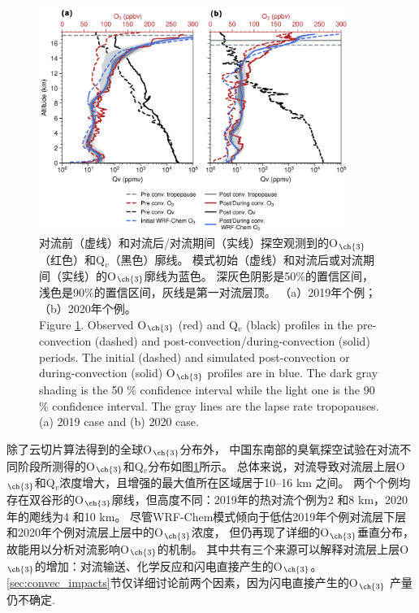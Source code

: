 \begin{figure}[H]
\centering
\includegraphics[width=0.9\textwidth]{./figures/ozonesonde_profile.png}
\caption{对流前（虚线）和对流后/对流期间（实线）探空观测到的O$_{\ch{3}}$（红色）和Q$_v$（黑色）廓线。
模式初始（虚线）和对流后或对流期间（实线）的O$_{\ch{3}}$廓线为蓝色。
深灰色阴影是50\%的置信区间，浅色是90\%的置信区间，灰线是第一对流层顶。
（a）2019年个例；（b）2020年个例。\\
Figure \ref{fig:ozonesonde_profile}. Observed O$_{\ch{3}}$ (red) and Q$_v$ (black) profiles in the pre-convection (dashed) and post-convection/during-convection (solid) periods.
The initial (dashed) and simulated post-convection or during-convection (solid) O$_{\ch{3}}$ profiles are in blue.
The dark gray shading is the 50 \% confidence interval while the light one is the 90 \% confidence interval.
The gray lines are the lapse rate tropopauses.
(a) 2019 case and (b) 2020 case.
}
\label{fig:ozonesonde_profile}
\end{figure}

除了云切片算法得到的全球O$_{\ch{3}}$分布外，
中国东南部的臭氧探空试验在对流不同阶段所测得的O$_{\ch{3}}$和Q$_v$分布如图\ref{fig:ozonesonde_profile}所示。
总体来说，对流导致对流层上层O$_{\ch{3}}$和Q$_v$浓度增大，且增强的最大值所在区域居于10--16 km 之间。
两个个例均存在双谷形的O$_{\ch{3}}$廓线，但高度不同：2019年的热对流个例为2 和8 km，2020年的飑线为4 和10 km。
尽管WRF-Chem模式倾向于低估2019年个例对流层下层和2020年个例对流层上层中的O$_{\ch{3}}$浓度，
但仍再现了详细的O$_{\ch{3}}$垂直分布，故能用以分析对流影响O$_{\ch{3}}$的机制。
其中共有三个来源可以解释对流层上层O$_{\ch{3}}$的增加：对流输送、化学反应和闪电直接产生的O$_{\ch{3}}$。
\ref{sec:convec_impacts}节仅详细讨论前两个因素，因为闪电直接产生的O$_{\ch{3}}$
产量仍不确定\citep{Morris.2010,Ripoll.2014}.

